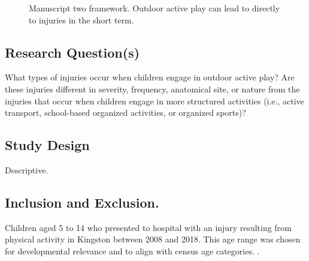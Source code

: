 \documentclass [11pt]{article}
\begin{document}
\begin{figure}[h]
\centering
{}
\caption{Manuscript two framework. Outdoor active play can lead to directly to injuries in the short term.}
\label{m2fig}
\end{figure}


\subsection{Research Question(s)} What types of injuries occur when children engage in outdoor active play? Are these injuries different in severity, frequency, anatomical site, or nature from the injuries that occur when children engage in more structured activities (i.e., active transport, school-based organized activities, or organized sports)? 

\subsection{Study Design} Descriptive. 

\subsection{Inclusion and Exclusion.} Children aged 5 to 14 who presented to hospital with an injury resulting from physical activity in Kingston between 2008 and 2018. This age range was chosen for developmental relevance and to align with census age categories. \cite{truelove2017defining, Government_of_Canada2017-iu}. 
\end{document}
